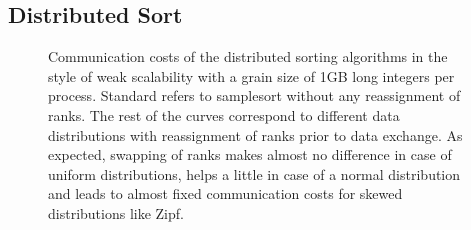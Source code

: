 \subsection{Distributed Sort}

\begin{figure}
\caption{\label{fig:comm} Communication costs of the distributed sorting algorithms in the style of weak scalability with a grain size of 1GB long integers per process. Standard refers to samplesort without any reassignment of ranks. The rest of the curves correspond to different data distributions with reassignment of ranks prior to data exchange. As expected, swapping of ranks makes almost no difference in case of uniform distributions, helps a little in case of a normal distribution and leads to almost fixed communication costs for skewed distributions like Zipf.}
\end{figure}
